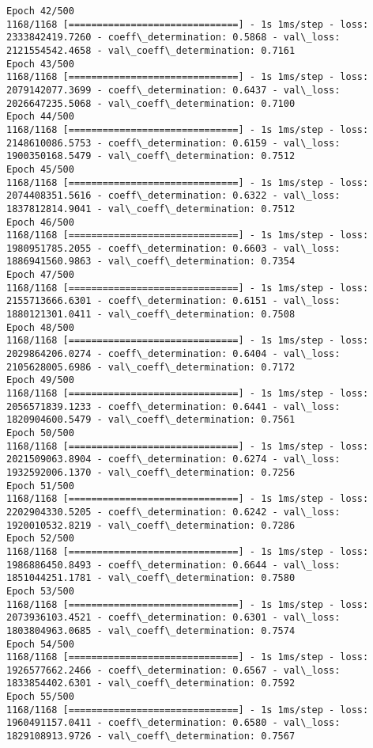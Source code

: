 \documentclass[11pt]{article}
\begin{document}
\begin{Verbatim}[commandchars=\\\{\}]
Epoch 42/500
1168/1168 [==============================] - 1s 1ms/step - loss: 2333842419.7260 - coeff\_determination: 0.5868 - val\_loss: 2121554542.4658 - val\_coeff\_determination: 0.7161
Epoch 43/500
1168/1168 [==============================] - 1s 1ms/step - loss: 2079142077.3699 - coeff\_determination: 0.6437 - val\_loss: 2026647235.5068 - val\_coeff\_determination: 0.7100
Epoch 44/500
1168/1168 [==============================] - 1s 1ms/step - loss: 2148610086.5753 - coeff\_determination: 0.6159 - val\_loss: 1900350168.5479 - val\_coeff\_determination: 0.7512
Epoch 45/500
1168/1168 [==============================] - 1s 1ms/step - loss: 2074408351.5616 - coeff\_determination: 0.6322 - val\_loss: 1837812814.9041 - val\_coeff\_determination: 0.7512
Epoch 46/500
1168/1168 [==============================] - 1s 1ms/step - loss: 1980951785.2055 - coeff\_determination: 0.6603 - val\_loss: 1886941560.9863 - val\_coeff\_determination: 0.7354
Epoch 47/500
1168/1168 [==============================] - 1s 1ms/step - loss: 2155713666.6301 - coeff\_determination: 0.6151 - val\_loss: 1880121301.0411 - val\_coeff\_determination: 0.7508
Epoch 48/500
1168/1168 [==============================] - 1s 1ms/step - loss: 2029864206.0274 - coeff\_determination: 0.6404 - val\_loss: 2105628005.6986 - val\_coeff\_determination: 0.7172
Epoch 49/500
1168/1168 [==============================] - 1s 1ms/step - loss: 2056571839.1233 - coeff\_determination: 0.6441 - val\_loss: 1820904600.5479 - val\_coeff\_determination: 0.7561
Epoch 50/500
1168/1168 [==============================] - 1s 1ms/step - loss: 2021509063.8904 - coeff\_determination: 0.6274 - val\_loss: 1932592006.1370 - val\_coeff\_determination: 0.7256
Epoch 51/500
1168/1168 [==============================] - 1s 1ms/step - loss: 2202904330.5205 - coeff\_determination: 0.6242 - val\_loss: 1920010532.8219 - val\_coeff\_determination: 0.7286
Epoch 52/500
1168/1168 [==============================] - 1s 1ms/step - loss: 1986886450.8493 - coeff\_determination: 0.6644 - val\_loss: 1851044251.1781 - val\_coeff\_determination: 0.7580
Epoch 53/500
1168/1168 [==============================] - 1s 1ms/step - loss: 2073936103.4521 - coeff\_determination: 0.6301 - val\_loss: 1803804963.0685 - val\_coeff\_determination: 0.7574
Epoch 54/500
1168/1168 [==============================] - 1s 1ms/step - loss: 1926577662.2466 - coeff\_determination: 0.6567 - val\_loss: 1833854402.6301 - val\_coeff\_determination: 0.7592
Epoch 55/500
1168/1168 [==============================] - 1s 1ms/step - loss: 1960491157.0411 - coeff\_determination: 0.6580 - val\_loss: 1829108913.9726 - val\_coeff\_determination: 0.7567

\end{Verbatim}
\end{document}
